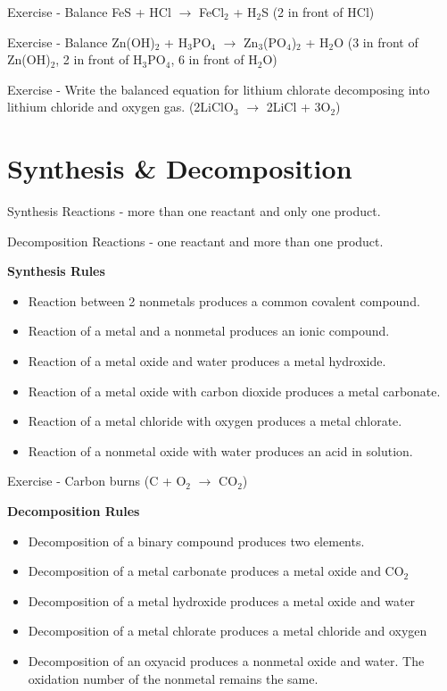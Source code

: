 \documentclass[../hchem.tex]{subfiles}
\begin{document}
Exercise - Balance FeS + HCl $\rightarrow$ FeCl$_2$ + H$_2$S (2 in front of HCl)

Exercise - Balance Zn(OH)$_2$ + H$_3$PO$_4$ $\rightarrow$ Zn$_3$(PO$_4$)$_2$ + H$_2$O (3 in front of Zn(OH)$_2$, 2 in front of H$_3$PO$_4$, 6 in front of H$_2$O)

Exercise - Write the balanced equation for lithium chlorate decomposing into lithium chloride and oxygen gas. (2LiClO$_3$ $\rightarrow$ 2LiCl + 3O$_2$)
\section{Synthesis \& Decomposition}
Synthesis Reactions - more than one reactant and only one product.

Decomposition Reactions - one reactant and more than one product.

\textbf{Synthesis Rules}
\begin{itemize}
    \item Reaction between 2 nonmetals produces a common covalent compound.
    \item Reaction of a metal and a nonmetal produces an ionic compound.
    \item Reaction of a metal oxide and water produces a metal hydroxide.
    \item Reaction of a metal oxide with carbon dioxide produces a metal carbonate.
    \item Reaction of a metal chloride with oxygen produces a metal chlorate.
    \item Reaction of a nonmetal oxide with water produces an acid in solution.
\end{itemize}

Exercise - Carbon burns (C + O$_2$ $\rightarrow$ CO$_2$)

\textbf{Decomposition Rules}
\begin{itemize}
    \item Decomposition of a binary compound produces two elements.
    \item Decomposition of a metal carbonate produces a metal oxide and CO$_2$
    \item Decomposition of a metal hydroxide produces a metal oxide and water 
    \item Decomposition of a metal chlorate produces a metal chloride and oxygen 
    \item Decomposition of an oxyacid produces a nonmetal oxide and water. The oxidation number of the nonmetal remains the same.
\end{itemize}
\end{document}
